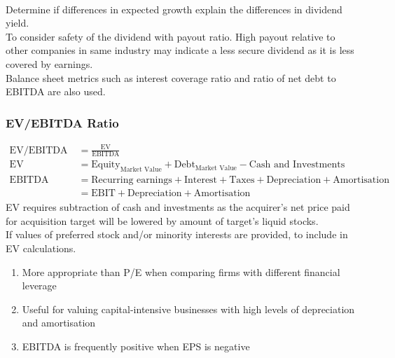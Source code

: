 \begin{definition} \\
Determine if differences in expected growth explain the differences in dividend yield.\\
To consider safety of the dividend with payout ratio. High payout relative to other companies in same industry may indicate a less secure dividend as it is less covered by earnings.\\
Balance sheet metrics such as interest coverage ratio and ratio of net debt to EBITDA are also used.
\end{definition}

\subsubsection{EV/EBITDA Ratio}

\begin{definition} 
\begin{align}
\text{EV/EBITDA Ratio} &= \frac{\text{EV}}{\text{EBITDA}} \nonumber \\
\text{EV} &= \text{Equity}_{\text{Market Value}} + \text{Debt}_{\text{Market Value}} - \text{Cash and Investments} \nonumber \\
\text{EBITDA} &= \text{Recurring earnings} + \text{Interest} + \text{Taxes} + \text{Depreciation} + \text{Amortisation} \nonumber \\
&= \text{EBIT} + \text{Depreciation} + \text{Amortisation} \nonumber
\end{align}
EV requires subtraction of cash and investments as the acquirer's net price paid for acquisition target will be lowered by amount of target's liquid stocks.\\
If values of preferred stock and/or minority interests are provided, to include in EV calculations.
\end{definition}

\begin{remark} 
\begin{enumerate}[label=\roman*.]
\setlength{\itemsep}{0pt}
\item More appropriate than P/E when comparing firms with different financial leverage
\item Useful for valuing capital-intensive businesses with high levels of depreciation and amortisation
\item EBITDA is frequently positive when EPS is negative
\end{enumerate}
\end{remark}


